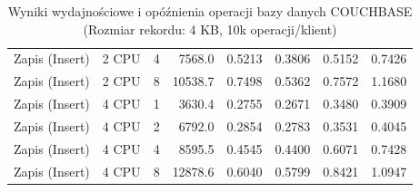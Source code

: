 \begin{table}[ht]
{\begin{tabular}{llcrrrrr}
Zapis (Insert) & 2 CPU & 4 & 7568.0 & 0.5213 & 0.3806 & 0.5152 & 0.7426 \\
Zapis (Insert) & 2 CPU & 8 & 10538.7 & 0.7498 & 0.5362 & 0.7572 & 1.1680 \\
Zapis (Insert) & 4 CPU & 1 & 3630.4 & 0.2755 & 0.2671 & 0.3480 & 0.3909 \\
Zapis (Insert) & 4 CPU & 2 & 6792.0 & 0.2854 & 0.2783 & 0.3531 & 0.4045 \\
Zapis (Insert) & 4 CPU & 4 & 8595.5 & 0.4545 & 0.4400 & 0.6071 & 0.7428 \\
Zapis (Insert) & 4 CPU & 8 & 12878.6 & 0.6040 & 0.5799 & 0.8421 & 1.0947 \\
\bottomrule
\end{tabular}%
}
\caption{Wyniki wydajnościowe i opóźnienia operacji bazy danych COUCHBASE (Rozmiar rekordu: 4 KB, 10k operacji/klient)}
\label{tab:latency_couchbase_medium_10000}
\end{table}
